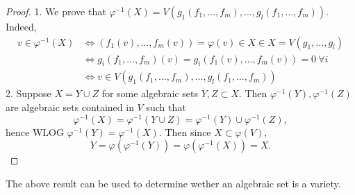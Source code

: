 \begin{proof}
    1. We prove that $\varphi^{-1}(X) = V(g_1(f_1,\dots,f_m),\dots,g_l(f_1,\dots,f_m))$. Indeed,
    \begin{align*}
        v \in \varphi^{-1}(X) &\iff (f_1(v),\dots,f_m(v))=\varphi(v)\in X \in X = V(g_1,\dots,g_l)\\ 
        &\iff g_i(f_1,\dots,f_m)(v)=g_i(f_1(v),\dots,f_m(v)) = 0 \ \forall i\\
        &\iff v\in V(g_1(f_1,\dots,f_m),\dots,g_l(f_1,\dots,f_m))
    \end{align*}
    2. Suppose $X=Y\cup Z$ for some algebraic sets $Y,Z\subset X$. Then $\varphi^{-1}(Y),\varphi^{-1}(Z)$ are algebraic sets contained in $V$ such that
    $$\varphi^{-1}(X) = \varphi^{-1}(Y\cup Z) =\varphi^{-1}(Y)\cup \varphi^{-1}(Z),$$
    hence WLOG $\varphi^{-1}(Y) = \varphi^{-1}(X)$. Then since $X\subset \varphi(V)$, $$Y= \varphi(\varphi^{-1}(Y))=\varphi(\varphi^{-1}(X))=X.$$
\end{proof}
The above result can be used to determine wether an algebraic set is a variety.

